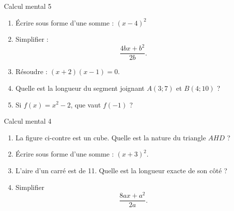 \documentclass{beamer}
\begin{document}

\begin{frame}{Calcul mental 5}

    \begin{enumerate}
        \item

    \pause
            Écrire sous forme d'une somme : \( (x-4)^2\)

        \item
    \pause
            Simplifier :
            \begin{equation}
                \frac{ 4bx+b^2 }{ 2b }.
            \end{equation}
        \item

    \pause
            Résoudre : \( (x+2)(x-1)=0\).

        \item
    \pause
            Quelle est la longueur du segment joignant \( A(3;7)\) et \( B(4;10)\) ?
        \item
    \pause
            Si \( f(x)=x^2-2\), que vaut \( f(-1)\) ?
            
    \end{enumerate}
\end{frame}

    

\begin{frame}{Calcul mental 4}

    \begin{enumerate}
        \item

    \pause
            \begin{multicols}{2}

                La figure ci-contre est un cube. Quelle est la nature du triangle \( AHD\) ?

                \columnbreak

                
            \end{multicols}

        \item
    \pause
            Écrire sous forme d'une somme : $(x+3)^2$.
        \item
            \pause
            L'aire d'un carré est de \unit{11}{\centi\meter\squared}. Quelle est la longueur exacte de son côté ?
        \item
            \pause
            Simplifier 
            \begin{equation}
                \frac{ 8ax+a^2 }{ 2a }.
            \end{equation}
            
    \end{enumerate}
\end{frame}
\end{document}
